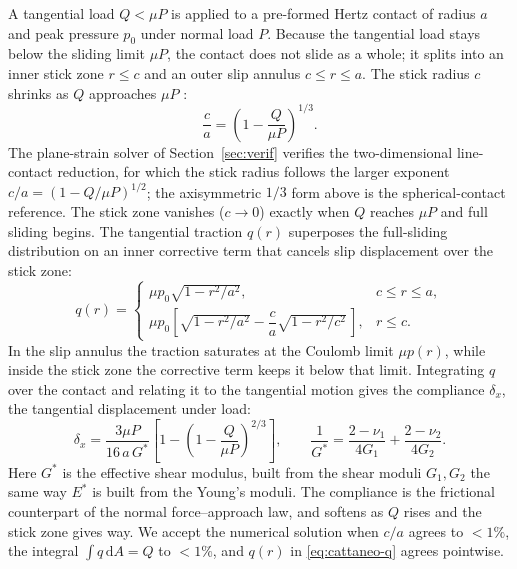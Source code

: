 \documentclass{svjour3}                 %
\begin{document}
\begin{appendix}
A tangential load $Q<\mu P$ is applied to a pre-formed Hertz contact of radius $a$ and
peak pressure $p_0$ under normal load $P$. Because the tangential load stays below the
sliding limit $\mu P$, the contact does not slide as a whole; it splits into an
inner stick zone $r\le c$ and an outer slip annulus $c\le r\le a$. The stick radius $c$
shrinks as $Q$ approaches $\mu P$ \citep{mindlin1949compliance,johnson1985contact}:
\begin{equation}\label{eq:cattaneo-c}
  \frac{c}{a} = \left(1-\frac{Q}{\mu P}\right)^{1/3}.
\end{equation}
The plane-strain solver of Section~\ref{sec:verif} verifies the two-dimensional line-contact
reduction, for which the stick radius follows the larger exponent
$c/a = (1-Q/\mu P)^{1/2}$; the axisymmetric $1/3$ form above is the spherical-contact reference.
The stick zone vanishes ($c\to0$) exactly when $Q$ reaches $\mu P$ and full sliding
begins. The tangential traction $q(r)$ superposes the full-sliding distribution on an
inner corrective term that cancels slip displacement over the stick zone:
\begin{equation}\label{eq:cattaneo-q}
  q(r) =
  \begin{cases}
    \mu p_0\sqrt{1-r^2/a^2}, & c\le r\le a,\\[4pt]
    \mu p_0\!\left[\sqrt{1-r^2/a^2}-\dfrac{c}{a}\sqrt{1-r^2/c^2}\,\right], & r\le c.
  \end{cases}
\end{equation}
In the slip annulus the traction saturates at the Coulomb limit $\mu p(r)$, while inside
the stick zone the corrective term keeps it below that limit. Integrating $q$ over the
contact and relating it to the tangential motion gives the compliance $\delta_x$, the
tangential displacement under load:
\begin{equation}\label{eq:cattaneo-delta}
  \delta_x = \frac{3\mu P}{16\,a\,G^\ast}\!\left[1-\left(1-\frac{Q}{\mu P}\right)^{2/3}\right],
  \qquad
  \frac{1}{G^\ast} = \frac{2-\nu_1}{4G_1}+\frac{2-\nu_2}{4G_2}.
\end{equation}
Here $G^\ast$ is the effective shear modulus, built from the shear moduli $G_1,G_2$ the
same way $E^\ast$ is built from the Young's moduli. The compliance is the frictional
counterpart of the normal force--approach law, and softens as $Q$ rises and the stick zone
gives way. We accept the numerical solution when $c/a$ agrees to $<1\%$, the integral
$\int q\,\mathrm{d}A = Q$ to $<1\%$, and $q(r)$ in \eqref{eq:cattaneo-q} agrees pointwise.


\end{appendix}
\end{document}
